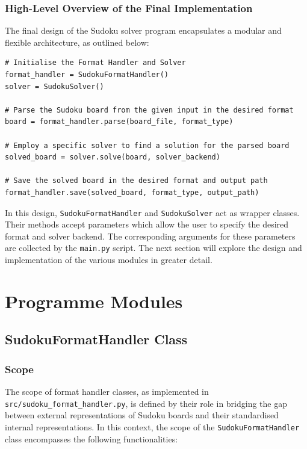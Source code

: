 \documentclass[11pt]{article}
\begin{document}
\subsubsection{High-Level Overview of the Final Implementation}
The final design of the Sudoku solver program encapsulates a modular and flexible architecture, as outlined below:

\begin{verbatim}
# Initialise the Format Handler and Solver
format_handler = SudokuFormatHandler()
solver = SudokuSolver()

# Parse the Sudoku board from the given input in the desired format
board = format_handler.parse(board_file, format_type)

# Employ a specific solver to find a solution for the parsed board 
solved_board = solver.solve(board, solver_backend)

# Save the solved board in the desired format and output path
format_handler.save(solved_board, format_type, output_path)
\end{verbatim}

In this design, \texttt{SudokuFormatHandler} and \texttt{SudokuSolver} act as wrapper classes. Their methods accept parameters which allow the user to specify the desired format and solver backend. The corresponding arguments for these parameters are collected by the \texttt{main.py} script. The next section will explore the design and implementation of the various modules in greater detail.

\section{Programme Modules}
\subsection{SudokuFormatHandler Class}

\subsubsection{Scope}
The scope of format handler classes, as implemented in \texttt{src/sudoku\_format\_handler.py}, is defined by their role in bridging the gap between external representations of Sudoku boards and their standardised internal representations. In this context, the scope of the \texttt{SudokuFormatHandler} class encompasses the following functionalities:
\end{document}
